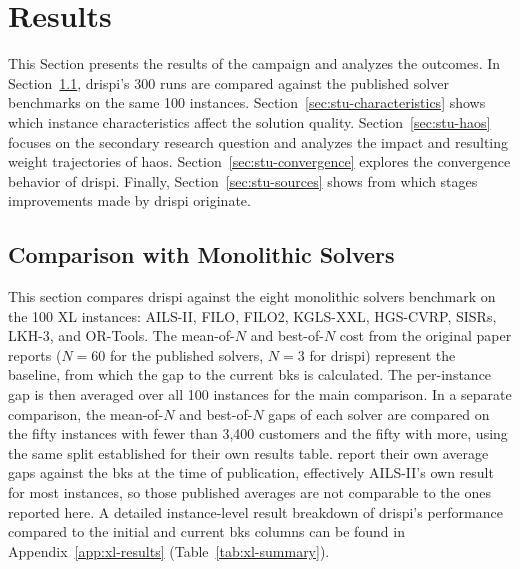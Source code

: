 \section{Results}
\label{sec:stu-results}

This Section presents the results of the campaign and analyzes the outcomes. In Section~\ref{sec:stu-comparison}, \gls{drispi}'s 300 runs are compared against the published solver benchmarks on the same 100 instances. Section~\ref{sec:stu-characteristics} shows which instance characteristics affect the solution quality. Section~\ref{sec:stu-haos} focuses on the secondary research question and analyzes the impact and resulting weight trajectories of \gls{haos}.
Section~\ref{sec:stu-convergence} explores the convergence behavior of \gls{drispi}. Finally, Section~\ref{sec:stu-sources} shows from which stages improvements made by \gls{drispi} originate.

\subsection{Comparison with Monolithic Solvers}\label{sec:stu-comparison}

This section compares \gls{drispi} against the eight monolithic solvers \citet{queirogaXLInstancesCapacitated2026} benchmark on the 100 XL instances: AILS-II, FILO, FILO2, KGLS-XXL, HGS-CVRP, SISRs, LKH-3, and OR-Tools. The mean-of-$N$ and best-of-$N$ cost from the original paper reports ($N = 60$ for the published solvers, $N = 3$ for \gls{drispi}) represent the baseline, from which the gap to the current \gls{bks} is calculated. The per-instance gap is then averaged over all 100 instances for the main comparison. In a separate comparison, the mean-of-$N$ and best-of-$N$ gaps of each solver are compared on the fifty instances with fewer than 3,400 customers and the fifty with more, using the same split \citet{queirogaXLInstancesCapacitated2026} established for their own results table. \citet{queirogaXLInstancesCapacitated2026} report their own average gaps against the \gls{bks} at the time of publication, effectively AILS-II's own result for most instances, so those published averages are not comparable to the ones reported here. A detailed instance-level result breakdown of \gls{drispi}'s performance compared to the initial and current \gls{bks} columns can be found in Appendix~\ref{app:xl-results} (Table~\ref{tab:xl-summary}).

